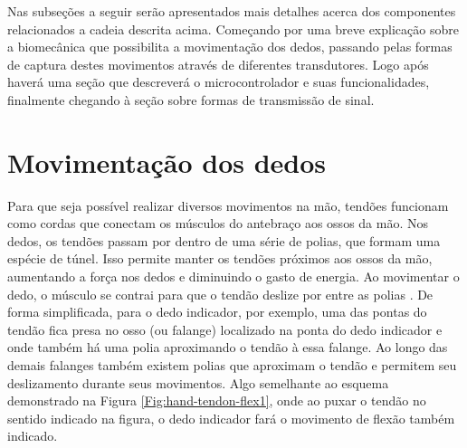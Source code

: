 \documentclass[
	12pt,				%
	openright,			%
	oneside,			%
	a4paper,			%
	english,			%
	brazil				%
	]{abntex2}
\begin{document}
		Nas subseções a seguir serão apresentados mais detalhes acerca dos componentes relacionados a cadeia descrita acima. Começando por uma breve explicação sobre a biomecânica que possibilita a movimentação dos dedos, passando pelas formas de captura destes movimentos através de diferentes transdutores. Logo após haverá uma seção que descreverá o microcontrolador e suas funcionalidades, finalmente chegando à seção sobre formas de transmissão de sinal.





		\section{Movimentação dos dedos} \label{sec:movimentacaodosdedos}


		Para que seja possível realizar diversos movimentos na mão, tendões funcionam como cordas que conectam os músculos do antebraço aos ossos da mão. Nos dedos, os tendões passam por dentro de uma série de polias, que formam uma espécie de túnel. Isso permite manter os tendões próximos aos ossos da mão, aumentando a força nos dedos e diminuindo o gasto de energia. Ao movimentar o dedo, o músculo se contrai para que o tendão deslize por entre as polias \cite{drricardocirurgiao}. De forma simplificada, para o dedo indicador, por exemplo, uma das pontas do tendão fica presa no osso (ou falange) localizado na ponta do dedo indicador e onde também há uma polia aproximando o tendão à essa falange. Ao longo das demais falanges também existem polias que aproximam o tendão e permitem seu deslizamento durante seus movimentos. Algo semelhante ao esquema demonstrado na Figura \ref{Fig:hand-tendon-flex1}, onde ao puxar o tendão no sentido indicado na figura, o dedo indicador fará o movimento de flexão também indicado.
\end{document}
